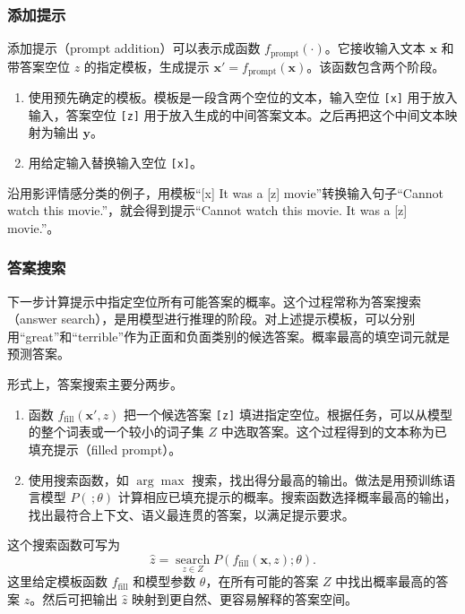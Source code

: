 \subsubsection{添加提示}
添加提示（prompt addition）可以表示成函数 $f_{\mathrm{prompt}}(\cdot)$。它接收输入文本 $\symbf{x}$ 和带答案空位 $z$ 的指定模板，生成提示 $\symbf{x}'=f_{\mathrm{prompt}}(\symbf{x})$。该函数包含两个阶段。
\begin{enumerate}
\item 使用预先确定的模板。模板是一段含两个空位的文本，输入空位 \texttt{[x]} 用于放入输入，答案空位 \texttt{[z]} 用于放入生成的中间答案文本。之后再把这个中间文本映射为输出 $\symbf{y}$。
\item 用给定输入替换输入空位 \texttt{[x]}。
\end{enumerate}
沿用影评情感分类的例子，用模板“[x] It was a [z] movie”转换输入句子“Cannot watch this movie.”，就会得到提示“Cannot watch this movie. It was a [z] movie.”。

\subsubsection{答案搜索}
下一步计算提示中指定空位所有可能答案的概率。这个过程常称为答案搜索（answer search），是用模型进行推理的阶段。对上述提示模板，可以分别用“great”和“terrible”作为正面和负面类别的候选答案。概率最高的填空词元就是预测答案。

形式上，答案搜索主要分两步。
\begin{enumerate}
\item 函数 $f_{\mathrm{fill}}(\symbf{x}',z)$ 把一个候选答案 \texttt{[z]} 填进指定空位。根据任务，可以从模型的整个词表或一个较小的词子集 $Z$ 中选取答案。这个过程得到的文本称为已填充提示（filled prompt）。
\item 使用搜索函数，如 $\arg\max$ 搜索，找出得分最高的输出。做法是用预训练语言模型 $P(\mathord{\,};\theta)$ 计算相应已填充提示的概率。搜索函数选择概率最高的输出，找出最符合上下文、语义最连贯的答案，以满足提示要求。
\end{enumerate}
这个搜索函数可写为
\begin{equation}
\hat{z}=\operatorname*{search}_{z\in Z} P(f_{\mathrm{fill}}(\symbf{x},z);\theta).
\tag{3.3}
\end{equation}
这里给定模板函数 $f_{\mathrm{fill}}$ 和模型参数 $\theta$，在所有可能的答案 $Z$ 中找出概率最高的答案 $z$。然后可把输出 $\hat{z}$ 映射到更自然、更容易解释的答案空间。

